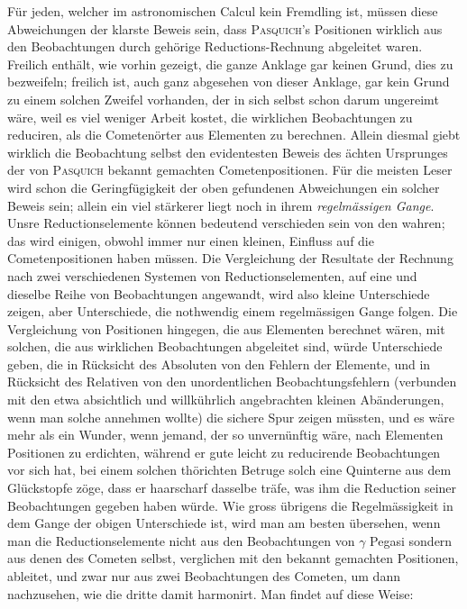 Für jeden, welcher im astronomischen Calcul kein Fremdling ist, müssen diese
Abweichungen der klarste Beweis sein, dass \textsc{Pasquich}'s Positionen wirklich
aus den Beobachtungen durch gehörige Reductions-Rechnung abgeleitet waren.
Freilich enthält, wie vorhin gezeigt, die ganze Anklage gar keinen Grund, dies zu
bezweifeln; freilich ist, auch ganz abgesehen von dieser Anklage, gar kein Grund zu
einem solchen Zweifel vorhanden, der in sich selbst schon darum ungereimt wäre,
weil es viel weniger Arbeit kostet, die wirklichen Beobachtungen zu reduciren, als
die Cometenörter aus Elementen zu berechnen. Allein diesmal giebt wirklich die
Beobachtung selbst den evidentesten Beweis des ächten Ursprunges der von
\textsc{Pasquich} bekannt gemachten Cometenpositionen. Für die meisten Leser wird
schon die Geringfügigkeit der oben gefundenen Abweichungen ein solcher Beweis
sein; allein ein viel \enlargethispage{1pt} stärkerer liegt noch in ihrem \emph{regelmässigen Gange}. Unsre Reductionselemente können bedeutend
verschieden sein von den wahren; das wird einigen, obwohl immer nur einen kleinen, Einfluss auf die
Cometenpositionen haben müssen. Die Vergleichung der Resultate der Rechnung nach zwei verschiedenen
Systemen von Reductionselementen, auf eine und dieselbe Reihe von Beobachtungen angewandt, wird
also kleine Unterschiede zeigen, aber Unterschiede, die nothwendig einem regelmässigen Gange
folgen. Die Vergleichung von Positionen hingegen, die aus Elementen berechnet wären, mit solchen,
die aus wirklichen Beobachtungen abgeleitet sind, würde Unterschiede geben, die in Rücksicht des
Absoluten von den Fehlern der Elemente, und in Rücksicht des Relativen von den unordentlichen
Beobachtungsfehlern (verbunden mit den etwa absichtlich und willkührlich angebrachten kleinen
Abänderungen, wenn man solche annehmen wollte) die sichere Spur zeigen müssten, und es wäre mehr
als ein Wunder, wenn jemand, der so unvernünftig wäre, nach Elementen Positionen zu erdichten,
während er gute leicht zu reducirende Beobachtungen vor sich hat, bei einem solchen thörichten
Betruge solch eine Quinterne aus dem Glückstopfe zöge, dass er haarscharf dasselbe träfe, was ihm
die Reduction seiner Beobachtungen gegeben haben würde. Wie gross übrigens die Regelmässigkeit in
dem Gange der obigen Unterschiede ist, wird man am besten übersehen, wenn man die
Reductionselemente nicht aus den Beobachtungen von $\gamma$ Pegasi sondern aus denen des Cometen
selbst, verglichen mit den bekannt gemachten Positionen, ableitet, und zwar nur aus zwei
Beobachtungen des Cometen, um dann nachzusehen, wie die dritte damit harmonirt. Man findet auf diese Weise:

